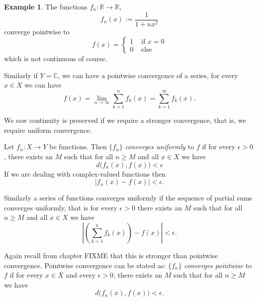 \documentclass[12pt]{book}
\newcommand{\abs}[1]{\left\lvert {#1} \right\rvert}
\newcommand{\C}{{\mathbb{C}}}
\newcommand{\R}{{\mathbb{R}}}
\newcommand{\myindex}[1]{#1\index{#1}}
\theoremstyle{plain}
\theoremstyle{remark}
\theoremstyle{definition}
\theoremstyle{exercise}
\theoremstyle{example}
\newtheorem{example}[thm]{Example}
\begin{document}
\begin{example}
The functions $f_n \colon \R \to \R$,
\begin{equation*}
f_n(x) := \frac{1}{1+nx^2}
\end{equation*}
converge pointwise to
\begin{equation*}
f(x) = 
\begin{cases}
1 & \text{ if $x=0$} \\
0 & \text{ else}
\end{cases}
\end{equation*}
which is not continuous of course.
\end{example}

Similarly if $Y=\C$, we can have a pointwise convergence of a series,
for every $x \in X$ we can have
\begin{equation*}
f(x) = \lim_{n\to \infty} \sum_{k=1}^n f_k(x) =
\sum_{k=1}^\infty f_k(x) .
\end{equation*}

We saw continuity is preserved if we require a stronger convergence,
that is, we require uniform convergence.

Let $f_n \colon X \to Y$ be functions.  Then
$\{f_n\}$ \emph{converges uniformly} to $f$ if
for every $\epsilon > 0$, there exists an $M$ such that
for all $n \geq M$ and all $x \in X$ we have
\begin{equation*}
d\bigl(f_n(x),f(x)\bigr) < \epsilon
\end{equation*}
If we are dealing with complex-valued functions then
\begin{equation*}
\abs{f_n(x)-f(x)} < \epsilon .
\end{equation*}

Similarly a series of functions converges uniformly if the sequence of
partial sums converges uniformly, that is for every $\epsilon > 0$
there exists an $M$ such that
for all $n \geq M$ and all $x \in X$ we have
\begin{equation*}
\abs{\left(\sum_{k=1}^nf_k(x)\right)-f(x)} < \epsilon .
\end{equation*}

Again recall from chapter FIXME that this is stronger than pointwise
convergence.  Pointwise convergence can be stated as:
$\{f_n\}$ \emph{\myindex{converges pointwise}} to $f$ if
for every $x \in X$ and
every $\epsilon > 0$, there exists an $M$ such that
for all $n \geq M$ we have
\begin{equation*}
d\bigl(f_n(x),f(x)\bigr) < \epsilon .
\end{equation*}
\end{document}
